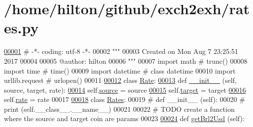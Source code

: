 \hypertarget{rates_8py_source}{}\section{/home/hilton/github/exch2exh/rates.py}

\begin{DoxyCode}
\hyperlink{namespacerates}{00001} \textcolor{comment}{# -*- coding: utf-8 -*-}
00002 \textcolor{stringliteral}{"""}
00003 \textcolor{stringliteral}{Created on Mon Aug  7 23:25:51 2017}
00004 \textcolor{stringliteral}{}
00005 \textcolor{stringliteral}{@author: hilton}
00006 \textcolor{stringliteral}{"""}
00007 \textcolor{keyword}{import} math           \textcolor{comment}{# trunc()}
00008 \textcolor{keyword}{import} time           \textcolor{comment}{# time()}
00009 \textcolor{keyword}{import} datetime       \textcolor{comment}{# class datetime}
00010 \textcolor{keyword}{import} urllib.request \textcolor{comment}{# urlopen()}
00011 
\hyperlink{classrates_1_1_rate}{00012} \textcolor{keyword}{class }\hyperlink{classrates_1_1_rate}{Rate}: 
\hyperlink{classrates_1_1_rate_a935221ad61f9c683e6da812ac7f53cc3}{00013}     \textcolor{keyword}{def }\hyperlink{classrates_1_1_rate_a935221ad61f9c683e6da812ac7f53cc3}{\_\_init\_\_} (self, source, target, rate): 
\hyperlink{classrates_1_1_rate_a82a6abb7536f2a4393f43456cfb1dc5e}{00014}         self.\hyperlink{classrates_1_1_rate_a82a6abb7536f2a4393f43456cfb1dc5e}{source} = source
\hyperlink{classrates_1_1_rate_adb1bbb0977c838106cb181a5941612c8}{00015}         self.\hyperlink{classrates_1_1_rate_adb1bbb0977c838106cb181a5941612c8}{target} = target
\hyperlink{classrates_1_1_rate_a5a660cfdfaa515a6e5809492525d61a7}{00016}         self.\hyperlink{classrates_1_1_rate_a5a660cfdfaa515a6e5809492525d61a7}{rate}   = rate        
00017         
\hyperlink{classrates_1_1_rates}{00018} \textcolor{keyword}{class }\hyperlink{classrates_1_1_rates}{Rates}:
00019 \textcolor{comment}{#    def \_\_init\_\_ (self):}
00020 \textcolor{comment}{#        print (self.\_\_class\_\_.\_\_name\_\_)}
00021 
00022     \textcolor{comment}{# TODO create a function where the source and target coin are params}
00023     
\hyperlink{namespacerates_a083f2cdcd71554d301bcbfb0779ffa49}{00024}     \textcolor{keyword}{def }\hyperlink{namespacerates_a083f2cdcd71554d301bcbfb0779ffa49}{getBrl2Usd} (self):

\end{DoxyCode}
